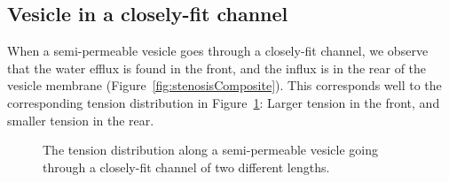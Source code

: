 \documentclass[9pt,twocolumn,twoside,lineno]{pnas-new}
\begin{document}
\subsection*{Vesicle in a closely-fit channel}
When a semi-permeable vesicle goes through a closely-fit channel, we observe that the water efflux is found in the front, and the influx is in the rear of the vesicle membrane (Figure~\ref{fig:stenosisComposite}). This corresponds well to the corresponding tension distribution in Figure~\ref{fig:stenosisTensions}: Larger tension in the front, and smaller tension in the rear.
\begin{figure}[htp]
  \centering
  \caption{\label{fig:stenosisTensions} The tension distribution along a
  semi-permeable vesicle going through a closely-fit channel of two
  different lengths.}
\end{figure}
\end{document}
